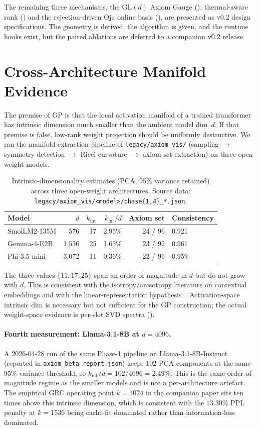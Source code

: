 \documentclass[11pt]{article}
\begin{document}
The remaining three mechanisms, the GL$(d)$ Axiom Gauge
(), thermal-aware rank () and the
rejection-driven Oja online basis (), are presented as
v0.2 design specifications. The geometry is derived, the algorithm is
given, and the runtime hooks exist, but the paired ablations are
deferred to a companion v0.2 release.

\section{Cross-Architecture Manifold Evidence}
\label{sec:manifold}


\noindent The premise of GP is that the local activation manifold of a trained
transformer has intrinsic dimension much smaller than the ambient model
dim~$d$.  If that premise is false, low-rank weight projection should be
uniformly destructive.  We ran the manifold-extraction pipeline of
\texttt{legacy/axiom\_vis/} (sampling $\to$ symmetry detection $\to$ Ricci
curvature $\to$ axiom-set extraction) on three open-weight models.

\begin{table}[h]\centering\small
\caption{Intrinsic-dimensionality estimates (PCA, 95\% variance retained)
across three open-weight architectures.  Source data:
\texttt{legacy/axiom\_vis/<model>/phase\{1,4\}\_*.json}.}
\begin{tabular}{@{}lrrrrl@{}}
\toprule
Model & $d$ & $k_\text{int}$ & $k_\text{int}/d$ & Axiom set & Consistency \\
\midrule
SmolLM2-135M  & 576   & 17 & 2.95\% & 24 / 96 & 0.921 \\
Gemma-4-E2B   & 1{,}536 & 25 & 1.63\% & 23 / 92 & 0.961 \\
Phi-3.5-mini  & 3{,}072 & 11 & 0.36\% & 22 / 96 & 0.959 \\
\bottomrule
\end{tabular}
\end{table}

The three values $\{11,17,25\}$ span an order of magnitude in $d$ but do
not grow with $d$.  This is consistent with the
isotropy/anisotropy literature on contextual embeddings and with the
linear-representation hypothesis~\cite{elhage2022superposition}.
Activation-space intrinsic dim is necessary but not sufficient for the GP
construction; the actual weight-space evidence is per-slot SVD spectra
().

\paragraph{Fourth measurement: Llama-3.1-8B at $d{=}4096$.}
A 2026-04-28 run of the same Phase-1 pipeline on Llama-3.1-8B-Instruct
(reported in \texttt{axiom\_beta\_report.json}) keeps $102$ PCA components
at the same 95\% variance threshold, so $k_\text{int}/d = 102/4096 =
2.49\%$. This is the same order-of-magnitude regime as the smaller models
and is not a per-architecture artefact. The empirical GRC operating
point $k{=}1024$ in the companion paper sits ten times above this
intrinsic dimension, which is consistent with the $13.30\%$ PPL penalty
at $k{=}1536$ being cache-fit dominated rather than information-loss
dominated.
\end{document}
